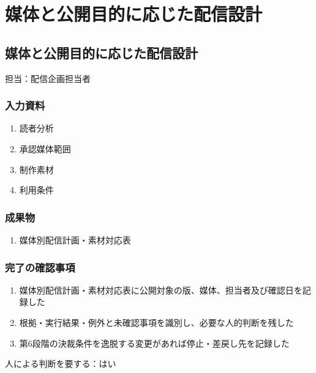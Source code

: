 \documentclass[a4paper,11pt]{article}
\begin{document}
\section{媒体と公開目的に応じた配信設計}
\subsection{媒体と公開目的に応じた配信設計}
\par 担当：配信企画担当者\par\medskip
\subsubsection*{入力資料}
\begin{enumerate}[leftmargin=2em,itemsep=0.35em]
\item 読者分析
\item 承認媒体範囲
\item 制作素材
\item 利用条件
\end{enumerate}
\subsubsection*{成果物}
\begin{enumerate}[leftmargin=2em,itemsep=0.35em]
\item 媒体別配信計画・素材対応表
\end{enumerate}
\subsubsection*{完了の確認事項}
\begin{enumerate}[leftmargin=2em,itemsep=0.35em]
\item 媒体別配信計画・素材対応表に公開対象の版、媒体、担当者及び確認日を記録した
\item 根拠・実行結果・例外と未確認事項を識別し、必要な人的判断を残した
\item 第6段階の決裁条件を逸脱する変更があれば停止・差戻し先を記録した
\end{enumerate}
\par 人による判断を要する：はい\par\medskip
\end{document}

